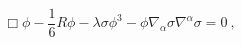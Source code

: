 \begin{equation}
\Box \phi-\frac{1}{6}R \phi-\lambda \sigma \phi^3- \phi
\nabla_{\alpha }\sigma \nabla^{\alpha  }\sigma =0~,
\label{6}\end{equation}

